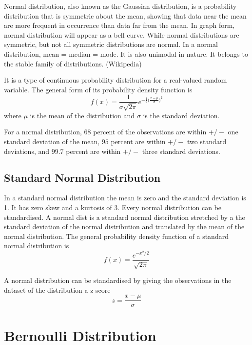 \documentclass[14pt, a4paper]{article}
\theoremstyle{definition}
\begin{document}
  
Normal distribution, also known as the Gaussian distribution, is a probability distribution that is symmetric about the mean, showing that data near the mean are more frequent in occurrence than data far from the mean. In graph form, normal distribution will appear as a bell curve. While normal distributions are symmetric, but not all symmetric distributions are normal. In a normal distribution, mean = median = mode. It is also unimodal in nature. It belongs to the stable family of distributions. (Wikipedia)

It is a type of continuous probability distribution for a real-valued random variable. The general form of its probability density function is 
\[ f(x) = \frac{1}{\sigma \sqrt{2 \pi } } e^{ - \frac{1}{2} \big( \frac{x-\mu}{\sigma} \big) ^2 }  \]
where $\mu$ is the mean of the distribution and $\sigma$ is the standard deviation.

For a normal distribution, $68$ percent of the observations are within $+/-$ one standard deviation of the mean, $95$ percent are within $+/-$ two standard deviations, and $99.7$ percent are within $+/-$ three standard deviations.


\subsection{Standard Normal Distribution}
In a standard normal distribution the mean is zero and the standard deviation is 1. It has zero skew and a kurtosis of 3. Every normal distribution can be standardised. A normal dist is a standard normal distribution stretched by a the standard deviation of the normal distribution and translated by the mean of the normal distribution. The general probability density function of a standard normal distribution is 
\[ f(x) = \frac{e^{-x^2 / 2}}{\sqrt{2 \pi} } \]

A normal distribution can be standardised by giving the observations in the dataset of the distribution a z-score 
\[ z = \frac{x - \mu}{\sigma}\]

\section{Bernoulli Distribution}
\end{document}

